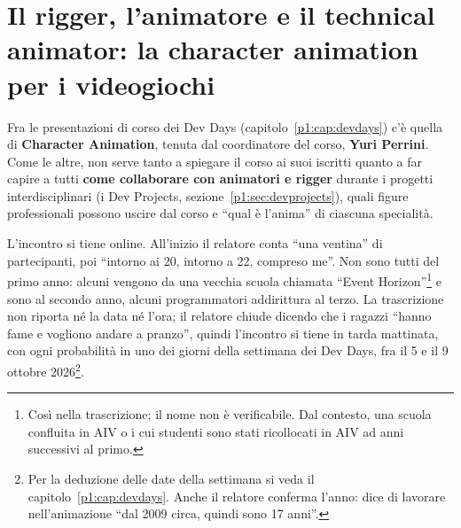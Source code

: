 %

\chapter[Rigger, animatore e technical animator]{Il rigger, l'animatore e
il technical animator: la character animation per i videogiochi}
\label{p4:cap:animation}

Fra le presentazioni di corso dei Dev Days (capitolo~\ref{p1:cap:devdays})
c'è quella di \textbf{Character Animation}, tenuta dal coordinatore del corso,
\textbf{Yuri Perrini}. Come le altre, non serve tanto a spiegare il corso ai
suoi iscritti quanto a far capire a tutti \textbf{come collaborare con
animatori e rigger} durante i progetti interdisciplinari (i Dev Projects,
sezione~\ref{p1:sec:devprojects}), quali figure professionali possono uscire
dal corso e ``qual è l'anima'' di ciascuna specialità.

L'incontro si tiene online. All'inizio il relatore conta ``una ventina'' di
partecipanti, poi ``intorno ai 20, intorno a 22, compreso me''. Non sono
tutti del primo anno: alcuni vengono da una vecchia scuola chiamata ``Event
Horizon''\footnote{Così nella trascrizione; il nome non è verificabile. Dal
contesto, una scuola confluita in AIV o i cui studenti sono stati
ricollocati in AIV ad anni successivi al primo.} e sono al secondo anno,
alcuni programmatori addirittura al terzo. La trascrizione non riporta né la
data né l'ora; il relatore chiude dicendo che i ragazzi ``hanno fame e
vogliono andare a pranzo'', quindi l'incontro si tiene in tarda mattinata,
con ogni probabilità in uno dei giorni della settimana dei Dev Days, fra il
5 e il 9 ottobre 2026\footnote{Per la deduzione delle date della settimana si
veda il capitolo~\ref{p1:cap:devdays}. Anche il relatore conferma l'anno: dice
di lavorare nell'animazione ``dal 2009 circa, quindi sono 17 anni''.}.

